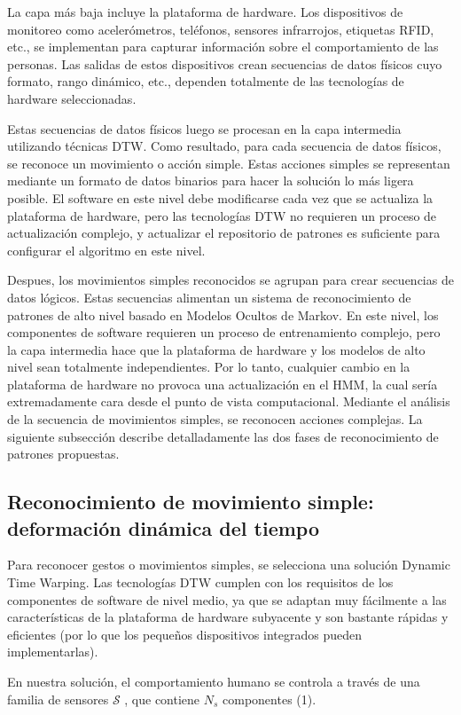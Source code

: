 \documentclass{article}
\begin{document}
La capa más baja incluye la plataforma de hardware. Los dispositivos de monitoreo como acelerómetros, teléfonos, sensores infrarrojos, etiquetas RFID, etc., se implementan para capturar información sobre el comportamiento de las personas. Las salidas de estos dispositivos crean secuencias de datos físicos cuyo formato, rango dinámico, etc., dependen totalmente de las tecnologías de hardware seleccionadas.

Estas secuencias de datos físicos luego se procesan en la capa intermedia utilizando técnicas DTW. Como resultado, para cada secuencia de datos físicos, se reconoce un movimiento o acción simple. Estas acciones simples se representan mediante un formato de datos binarios para hacer la solución lo más ligera posible. El software en este nivel debe modificarse cada vez que se actualiza la plataforma de hardware, pero las tecnologías DTW no requieren un proceso de actualización complejo, y actualizar el repositorio de patrones es suficiente para configurar el algoritmo en este nivel.

Despues, los movimientos simples reconocidos se agrupan para crear secuencias de datos lógicos. Estas secuencias alimentan un sistema de reconocimiento de patrones de alto nivel basado en Modelos Ocultos de Markov. En este nivel, los componentes de software requieren un proceso de entrenamiento complejo, pero la capa intermedia hace que la plataforma de hardware y los modelos de alto nivel sean totalmente independientes. Por lo tanto, cualquier cambio en la plataforma de hardware no provoca una actualización en el HMM, la cual sería extremadamente cara desde el punto de vista computacional. Mediante el análisis de la secuencia de movimientos simples, se reconocen acciones complejas. La siguiente subsección describe detalladamente las dos fases de reconocimiento de patrones propuestas.
\\
\subsection{Reconocimiento de movimiento simple: deformación dinámica del tiempo}
Para reconocer gestos o movimientos simples, se selecciona una solución Dynamic Time Warping. Las tecnologías DTW cumplen con los requisitos de los componentes de software de nivel medio, ya que se adaptan muy fácilmente a las características de la plataforma de hardware subyacente y son bastante rápidas y eficientes (por lo que los pequeños dispositivos integrados pueden implementarlas).

En nuestra solución, el comportamiento humano se controla a través de una familia de sensores $\mathscr{S}$ , que contiene $N_s$ componentes (1).
\end{document}
